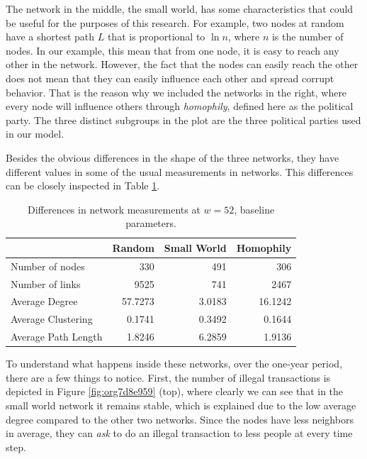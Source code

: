\documentclass[letterpaper, 11pt]{article}
\begin{document}
The network in the middle, the small world, has some characteristics that could be useful for the purposes of this research. For example, two nodes at random have a shortest path \(L\) that is proportional to \(\ln n\), where \(n\) is the number of nodes. In our example, this mean that from one node, it is easy to reach any other in the network. However, the fact that the nodes can easily reach the other does not mean that they can easily influence each other and spread corrupt behavior. That is the reason why we included the networks in the right, where every node will influence others through \emph{homophily}, defined here as the political party. The three distinct subgroups in the plot are the three political parties used in our model.

Besides the obvious differences in the shape of the three networks, they have different values in some of the usual measurements in networks. This differences can be closely inspected in Table \ref{tab:orgcc80923}. 

\begin{table}[htbp]
\caption{\label{tab:orgcc80923}
Differences in network measurements at \(w=52\), baseline parameters.}
\centering
\begin{tabular}{lrrr}
\hline
\hline
 & Random & Small World & Homophily\\
\hline
Number of nodes & 330 & 491 & 306\\
Number of links & 9525 & 741 & 2467\\
Average Degree & 57.7273 & 3.0183 & 16.1242\\
Average Clustering & 0.1741 & 0.3492 & 0.1644\\
Average Path Length & 1.8246 & 6.2859 & 1.9136\\
\hline
\hline
\end{tabular}
\end{table}

To understand what happens inside these networks, over the one-year period, there are a few things to notice. First, the number of illegal transactions is depicted in Figure \ref{fig:org7d8e959} (top), where clearly we can see that in the small world network it remains stable, which is explained due to the low average degree compared to the other two networks. Since the nodes have less neighbors in average, they can \emph{ask} to do an illegal transaction to less people at every time step. 
\end{document}
